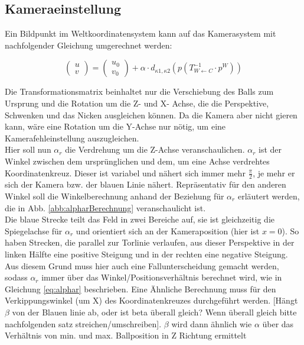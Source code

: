 \documentclass{ezb}
\begin{document}
\subsection{Kameraeinstellung}\label{b:kam}
Ein Bildpunkt im Weltkoordinatensystem kann auf das Kamerasystem mit nachfolgender Gleichung umgerechnet werden:\\
\begin{small}
\begin{equation}
\left(
\begin{array}{c}
      u \\
      v
\end{array}
\right)
=
\left(
\begin{array}{c}
      u_{0} \\
      v_{0}
\end{array}   
\right)
+ \alpha \cdot d_{\kappa1 ,\kappa2}(p(T^{-1}_{W\leftarrow C}\cdot p^{W})) 
\label{eq:Kameragleichung}
\end{equation}
\end{small}
Die Transformationsmatrix beinhaltet nur die Verschiebung des Balls zum Ursprung und die Rotation um die Z- und X- Achse, die die Perspektive, Schwenken und das Nicken ausgleichen können. Da die Kamera aber nicht gieren kann, wäre eine Rotation um die Y-Achse nur nötig, um eine Kamerafehleinstellung auszugleichen.\\
\linebreak
Hier soll nun $\alpha_{r}$ die Verdrehung um die Z-Achse veranschaulichen. $\alpha_{r}$ ist der Winkel zwischen dem ursprünglichen und dem, um eine Achse verdrehtes Koordinatenkreuz. Dieser ist variabel und nähert sich immer mehr $\frac{\pi}{2}$, je mehr er sich der Kamera bzw. der blauen Linie nähert. Repräsentativ für den anderen Winkel soll die Winkelberechnung anhand der Beziehung für $\alpha_{r}$ erläutert werden, die in Abb. \ref{abb:alpharBerechnung} veranschaulicht ist.\\
\linebreak
Die blaue Strecke teilt das Feld in zwei Bereiche auf, sie ist gleichzeitig die Spiegelachse für $\alpha_{r}$ und orientiert sich an der Kameraposition (hier ist $x=0$). So haben Strecken, die parallel zur Torlinie verlaufen, aus dieser Perspektive in der linken Hälfte eine positive Steigung und in der rechten eine negative Steigung. Aus diesem Grund muss hier auch eine Fallunterscheidung gemacht werden, sodass $\alpha_{r}$ immer über das Winkel/Positionsverhältnis berechnet wird, wie in Gleichung \ref{eq:alphar} beschrieben. Eine Ähnliche Berechnung muss für den Verkippungswinkel (um X) des Koordinatenkreuzes durchgeführt werden. [Hängt $\beta$ von der Blauen linie ab, oder ist beta überall gleich? Wenn überall gleich bitte nachfolgenden satz streichen/umschreiben]. $\beta$ wird dann ähnlich wie $\alpha$ über das Verhältnis von min. und max. Ballposition in Z Richtung ermittelt\\
\end{document}
